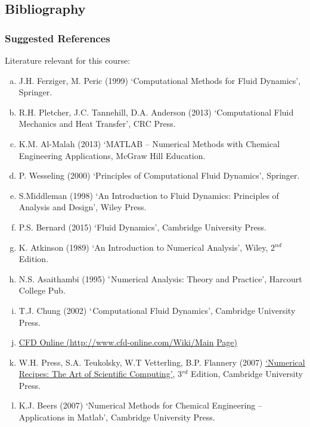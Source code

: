 \documentclass[10pt,compress,handout,ignorenonframetext]{beamer}
\begin{document}
\subsection{Bibliography} 
\begin{frame}
 \frametitle{Suggested References}
  Literature relevant for this course:
  \begin{enumerate}[(a)]\scriptsize
   \item J.H. Ferziger, M. Peric (1999) `Computational Methods for Fluid Dynamics', Springer.
   \item R.H. Pletcher, J.C. Tannehill, D.A. Anderson (2013) `Computational Fluid Mechanics and Heat Transfer', CRC Press.
   \item K.M. Al-Malah (2013) `MATLAB -- Numerical Methods with Chemical Engineering Applications, McGraw Hill Education.
   \item P. Wesseling (2000) `Principles of Computational Fluid Dynamics', Springer.
   \item S.Middleman (1998) `An Introduction to Fluid Dynamics: Principles of Analysis and Design', Wiley Press.
   \item P.S. Bernard (2015) `Fluid Dynamics', Cambridge University Press.
   \item K. Atkinson (1989) `An Introduction to Numerical Analysis', Wiley, 2$^{nd}$ Edition.
   \item N.S. Asaithambi (1995) $\lq$Numerical Analysis: Theory and Practice', Harcourt College Pub.
   \item T.J. Chung (2002) $\lq$Computational Fluid Dynamics', Cambridge University Press.
   \item \href{http://www.cfd-online.com/Wiki/Main_Page}{CFD Online (http://www.cfd-online.com/Wiki/Main$\_$Page)}
   \item W.H. Press, S.A. Teukolsky, W.T Vetterling, B.P. Flannery (2007) \href{http://www.nr.com/oldverswitcher.html}{`Numerical Recipes: The Art of Scientific Computing'}, 3$^{rd}$ Edition, Cambridge University Press.
   \item K.J. Beers (2007) `Numerical Methods for Chemical Engineering -- Applications in Matlab', Cambridge University Press.
  \end{enumerate}
\end{frame}
\end{document}
